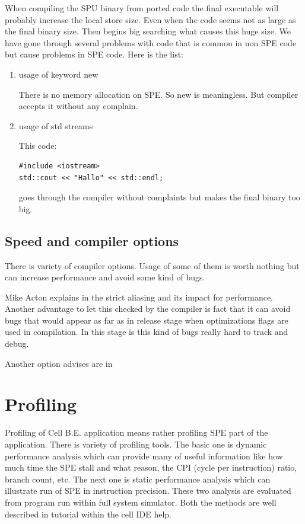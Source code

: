 \par
When compiling the SPU binary from ported code the final executable will probably increase the local store size.
Even when the code seems not as large as the final binary size.
Then begins big searching what causes this huge size.
We have gone through several problems with code that is common in non SPE code but cause problems in SPE code.
Here is the list:
\begin{enumerate}
\item usage of keyword new
\par
There is no memory allocation on SPE. So new is meaningless.
But compiler accepts it without any complain.

\item usage of std streams
\par
This code:
\begin{verbatim}
#include <iostream>
std::cout << "Hallo" << std::endl;
\end{verbatim}
goes through the compiler without complaints but makes the final binary too big.

\end{enumerate}

\subsection {Speed and compiler options}

\par
There is variety of compiler options.
Usage of some of them is worth nothing but can increase performance and avoid some kind of bugs.

\par
Mike Acton explains in \cite{strictAliasing} the strict aliasing and its impact for performance.
Another advantage to let this checked by the compiler is fact that it can avoid bugs that would appear as far as in release stage when optimizations flags are used in compilation.
In this stage is this kind of bugs really hard to track and debug.

\par
Another option advises are in \cite{compilerOptions}

\section{Profiling}

\par
Profiling of Cell B.E. application means rather profiling SPE part of the application.
There is variety of profiling tools.
The basic one is dynamic performance analysis which can provide many of useful information like how much time the SPE stall and what reason, the CPI (cycle per instruction) ratio, branch count, etc.
The next one is static performance analysis which can illustrate run of SPE in instruction precision.
These two analysis are evaluated from program run within full system simulator.
Both the methods are well described in tutorial within the cell IDE help.

